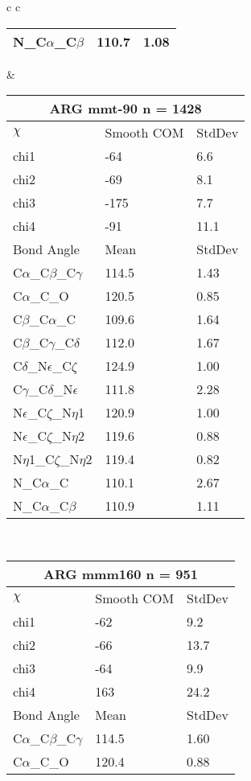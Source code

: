 \begin{longtable}{ c c }
\begin{tabular}{ l l l }
  N\_C$\alpha$\_C$\beta$ & 110.7 & 1.08\\
  \bottomrule
  \end{tabular}
  &
  \begin{tabular}{ l l l }
  \toprule
  \multicolumn{3}{c}{ARG \textbf{mmt-90} n = 1428} \\ \toprule
  $\chi$       & Smooth COM & StdDev \\ \midrule
  chi1 & -64 & 6.6 \\ 
  chi2 & -69 & 8.1 \\ 
  chi3 & -175 & 7.7 \\ 
  chi4 & -91 & 11.1 \\ \midrule
  Bond Angle   & Mean     & StdDev \\ \midrule
  C$\alpha$\_C$\beta$\_C$\gamma$ & 114.5 & 1.43\\
  C$\alpha$\_C\_O & 120.5 & 0.85\\
  C$\beta$\_C$\alpha$\_C & 109.6 & 1.64\\
  C$\beta$\_C$\gamma$\_C$\delta$ & 112.0 & 1.67\\
  C$\delta$\_N$\epsilon$\_C$\zeta$ & 124.9 & 1.00\\
  C$\gamma$\_C$\delta$\_N$\epsilon$ & 111.8 & 2.28\\
  N$\epsilon$\_C$\zeta$\_N$\eta$1 & 120.9 & 1.00\\
  N$\epsilon$\_C$\zeta$\_N$\eta$2 & 119.6 & 0.88\\
  N$\eta$1\_C$\zeta$\_N$\eta$2 & 119.4 & 0.82\\
  N\_C$\alpha$\_C & 110.1 & 2.67\\
  N\_C$\alpha$\_C$\beta$ & 110.9 & 1.11\\
  \bottomrule
  \end{tabular}
  \\
  \begin{tabular}{ l l l }
  \toprule
  \multicolumn{3}{c}{ARG \textbf{mmm160} n = 951} \\ \toprule
  $\chi$       & Smooth COM & StdDev \\ \midrule
  chi1 & -62 & 9.2 \\ 
  chi2 & -66 & 13.7 \\ 
  chi3 & -64 & 9.9 \\ 
  chi4 & 163 & 24.2 \\ \midrule
  Bond Angle   & Mean     & StdDev \\ \midrule
  C$\alpha$\_C$\beta$\_C$\gamma$ & 114.5 & 1.60\\
  C$\alpha$\_C\_O & 120.4 & 0.88\\

\end{tabular}
\end{longtable}
